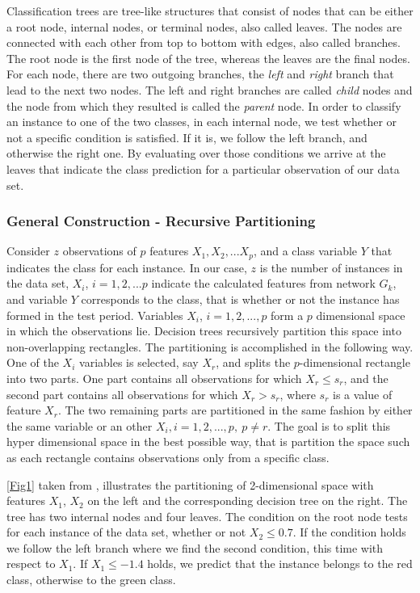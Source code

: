 \documentclass{acm_proc_article-sp}
\begin{document}
Classification trees are tree-like structures that consist of nodes that can be either a root node, internal nodes, or terminal nodes, also called leaves. The nodes are connected with each other from top to bottom with edges, also called branches. The root node is the first node of the tree, whereas the leaves are the final nodes. For each node, there are two outgoing branches, the \textit{left} and \textit{right} branch that lead to the next two nodes. The left and right branches are called \textit{child} nodes and the node from which they resulted is called the \textit{parent} node. In order to classify an instance to one of the two classes, in each internal node, we test whether or not a specific condition is satisfied. If it is, we follow the left branch, and otherwise the right one. By evaluating over those conditions we arrive at the leaves that indicate the class prediction for a particular observation of our data set. 

\subsubsection{General Construction - Recursive Partitioning}

Consider $z$ observations of $p$ features $X_1, X_2,...X_p$, and a class variable $Y$ that indicates the class for each instance. In our case, $z$ is the number of instances in the data set, $X_i$, $i = 1,2,...p$ indicate the calculated features from network $G_k$, and variable $Y$ corresponds to the class, that is whether or not the instance has formed in the test period. Variables $X_i$, $i = 1,2,...,p$ form a $p$ dimensional space in which the observations lie. Decision trees recursively partition this space into non-overlapping rectangles. The partitioning is accomplished in the following way. One of the $X_i$ variables is selected, say $X_r$, and splits the $p$-dimensional rectangle into two parts. One part contains all observations for which $X_r \leqslant s_r$, and the second part contains all observations for which $X_r > s_r$, where $s_r$ is a value of feature $X_r$. The two remaining parts are partitioned in the same fashion by either the same variable or an other $X_i, i = 1,2,..., p,\ p\neq r$. The goal is to split this hyper dimensional space in the best possible way, that is partition the space such as each rectangle contains observations only from a specific class. 

\autoref{Fig1} taken from \cite{WIDM:WIDM8}, illustrates the partitioning of 2-dimensional space with features $X_1$, $X_2$ on the left and the corresponding decision tree on the right. The tree has two internal nodes and four leaves. The condition on the root node tests for each instance of the data set, whether or not $X_2 \leqslant 0.7$. If the condition holds we follow the left branch where we find the second condition, this time with respect to $X_1$. If $X_1 \leqslant -1.4$ holds, we predict that the instance belongs to the red class, otherwise to the green class.
\end{document}
